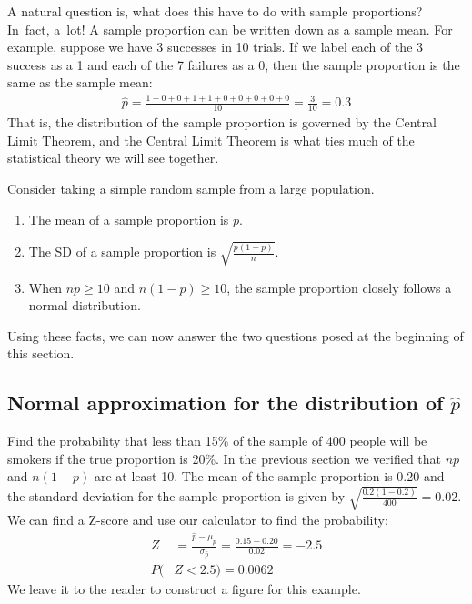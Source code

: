 A natural question is, what does this have to do with sample proportions? In~fact, a~lot! A sample proportion can be written down as a sample mean. For example, suppose we have 3 successes in 10 trials. If we label each of the 3 success as a 1 and each of the 7 failures as a 0, then the sample proportion is the same as the sample mean:
\begin{align*}
\hat{p}
	= \frac{1 + 0 + 0 + 1 + 1 + 0 + 0 + 0 + 0 + 0}{10}
	= \frac{3}{10}
	= 0.3
\end{align*}
That is, the distribution of the sample proportion is governed by the Central Limit Theorem, and the Central Limit Theorem is what ties much of the statistical theory we will see together.


\begin{tipBox}{
Consider taking a simple  random sample from a large population.
\begin{enumerate}
\setlength{\itemsep}{0mm}
\item The mean of a sample proportion is $p$.
\item The SD of a sample proportion is $\sqrt{\frac{p(1-p)}{n}}$.
\item When $np \geq 10$ and $n(1-p) \geq 10$, the sample proportion closely follows a normal distribution. 
\end{enumerate}}
\end{tipBox}

Using these facts, we can now answer the two questions posed at the beginning of this section.


\textA{\pagebreak}

\subsection{Normal approximation for the distribution of $\hat{p}$}

\begin{example}{Find the probability that less than 15\% of the sample of 400 people will be smokers if the true proportion is 20\%.}
In the previous section we verified that $np$ and $n(1-p)$ are at least 10. The mean of the sample proportion is 0.20 and the standard deviation for the sample proportion is given by $\sqrt{\frac{0.2(1-0.2)}{400}}=0.02$. We can find a Z-score and use our calculator to find the probability:
\begin{align*}
Z &= \frac{\hat{p} - \mu_{\hat{p}}}{\sigma_{\hat{p}}} = \frac{0.15 - 0.20}{0.02} = -2.5 \\
P(&Z < 2.5) = 0.0062
\end{align*}
We leave it to the reader to construct a figure for this example.
\label{smokers}
\end{example}

